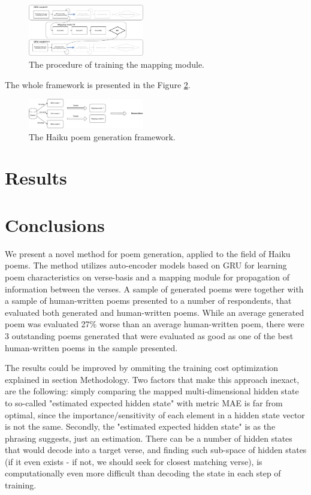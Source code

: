 \documentclass{acm_proc_article-sp}
\begin{document}
\begin{figure}[h!]
	\centering
	\includegraphics[width=0.45\textwidth]{flowchart/training.pdf}
    \caption[The procedure of training the mapping module.]{The procedure of training the mapping module.}
    \label{fig:training}
\end{figure}

The whole framework is presented in the Figure \ref{fig:fw}.

\begin{figure}[h!]
	\centering
	\includegraphics[width=0.45\textwidth]{flowchart/fw.pdf}
    \caption[The Haiku poem generation framework.]{The Haiku poem generation framework.}
    \label{fig:fw}
\end{figure}

\section{Results}

\section{Conclusions}

We present a novel method for poem generation, applied to the field of Haiku poems. The method utilizes auto-encoder models based on GRU for learning poem characteristics on verse-basis and a mapping module for propagation of information between the verses. A sample of generated poems were together with a sample of human-written poems presented to a number of respondents, that evaluated both generated and human-written poems. While an average generated poem was evaluated 27\% worse than an average human-written poem, there were 3 outstanding poems generated that were evaluated as good as one of the best human-written poems in the sample presented.

The results could be improved by ommiting the training cost optimization explained in section Methodology. Two factors that make this approach inexact, are the following: simply comparing the mapped multi-dimensional hidden state to so-called "estimated expected hidden state" with metric MAE is far from optimal, since the importance/sensitivity of each element in a hidden state vector is not the same. Secondly, the "estimated expected hidden state" is as the phrasing suggests, just an estimation. There can be a number of hidden states that would decode into a target verse, and finding such sub-space of hidden states (if it even exists - if not, we should seek for closest matching verse), is computationally even more difficult than decoding the state in each step of training.




\balancecolumns
\end{document}
